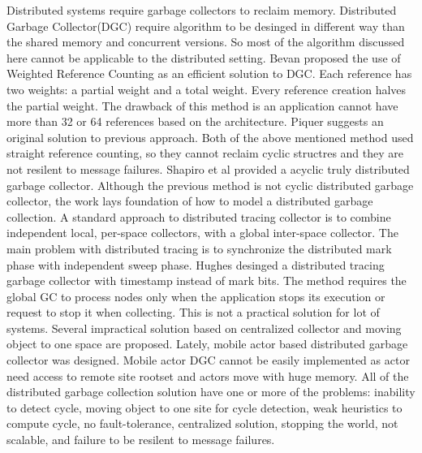 Distributed systems require garbage collectors to reclaim memory. Distributed Garbage Collector(DGC) require algorithm to be desinged in different way than the shared memory and concurrent versions. So most of the algorithm discussed here cannot be applicable to the distributed setting. Bevan\cite{Bevan87} proposed the use of Weighted Reference Counting as an efficient solution to DGC. Each reference has two weights: a partial weight and a total weight. Every reference creation halves the partial weight. The drawback of this method is an application cannot have more than 32 or 64 references based on the architecture. Piquer\cite{piquer91} suggests an original solution to previous approach. Both of the above mentioned method used straight reference counting, so they cannot reclaim cyclic structres and they are not resilent to message failures. Shapiro et al \cite{Shapiro92} provided a acyclic truly distributed garbage collector. Although the previous method is not cyclic distributed garbage collector, the work lays foundation of how to model a  distributed garbage collection. A standard approach to distributed tracing collector is to combine independent local, per-space collectors, with a global inter-space collector. The main problem with distributed tracing is to synchronize the distributed mark phase with independent sweep phase\cite{plain95}. Hughes desinged a distributed tracing garbage collector with  timestamp instead of mark bits\cite{hugh85}. The method requires the global GC to process nodes only when the application stops its execution or request to stop it when collecting. This is not a practical solution for lot of systems. Several impractical solution based on centralized collector and moving object to one space are proposed\cite{Maheshwari1997,Maheshwari1997b,Liskov,ladin,Veiga05}. Lately, mobile actor based distributed garbage collector was designed\cite{want}. Mobile actor DGC cannot be easily implemented as actor need access to remote site rootset and actors move with huge memory.  All of the distributed garbage collection solution have one or more of the problems: inability to detect cycle, moving object to one site for cycle detection, weak heuristics to compute cycle, no fault-tolerance, centralized solution, stopping the world, not scalable, and failure to be resilent to message failures.


